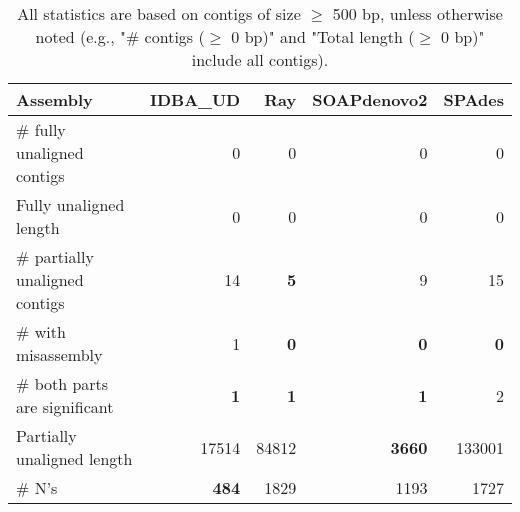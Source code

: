 \documentclass[12pt,a4paper]{article}
\begin{document}
\begin{table}[ht]
\begin{center}
\caption{All statistics are based on contigs of size $\geq$ 500 bp, unless otherwise noted (e.g., "\# contigs ($\geq$ 0 bp)" and "Total length ($\geq$ 0 bp)" include all contigs).}
\begin{tabular}{|l*{4}{|r}|}
\hline
Assembly & IDBA\_UD & Ray & SOAPdenovo2 & SPAdes \\ \hline
\# fully unaligned contigs & 0 & 0 & 0 & 0 \\ \hline
Fully unaligned length & 0 & 0 & 0 & 0 \\ \hline
\# partially unaligned contigs & 14 & {\bf 5} & 9 & 15 \\ \hline
\hspace{5mm}\# with misassembly & 1 & {\bf 0} & {\bf 0} & {\bf 0} \\ \hline
\hspace{5mm}\# both parts are significant & {\bf 1} & {\bf 1} & {\bf 1} & 2 \\ \hline
Partially unaligned length & 17514 & 84812 & {\bf 3660} & 133001 \\ \hline
\# N's & {\bf 484} & 1829 & 1193 & 1727 \\ \hline
\end{tabular}
\end{center}
\end{table}
\end{document}
